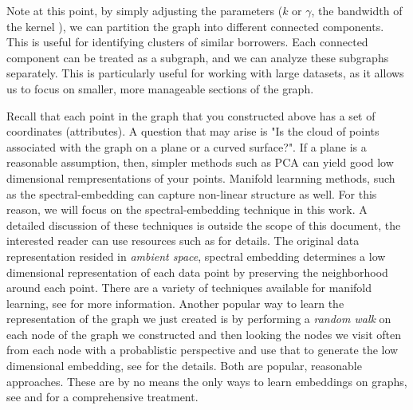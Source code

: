 \documentclass[12pt]{article}
\begin{document}
Note at this point, by simply adjusting the parameters ($k$ or $\gamma$, the bandwidth of the kernel ), we can partition the graph into different connected components. This is useful for identifying clusters of similar borrowers. Each connected component can be treated as a subgraph, and we can analyze these subgraphs separately. This is particularly useful for working with large datasets, as it allows us to focus on smaller, more manageable sections of the graph.

Recall that each point in the graph that you constructed above has a set of coordinates (attributes). A question that may arise is "Is the cloud of points associated with the graph on a plane or a curved surface?". If a plane is a reasonable assumption, then, simpler methods such as PCA can yield good low dimensional rempresentations of your points. Manifold learnning methods, such as the spectral-embedding can capture non-linear structure as well. For this reason, we will focus on the spectral-embedding technique in this work. A detailed discussion of these techniques is outside the scope of this document, the interested reader can use resources such as \cite{ghodsi_2017_unsup_learning_course} for details. The original data representation resided in \emph{ambient space}, spectral embedding determines a low dimensional representation of each data point by preserving the neighborhood around each point. There are a variety of techniques available for manifold learning, see \cite{ghodsi_2017_unsup_learning_course} for more information. Another popular way to learn the representation of the graph we just created is by performing a \emph{random walk} on each node of the graph we constructed and then looking the nodes we visit often from each node with a probablistic perspective and use that to generate the low dimensional embedding, see \cite{leskovic_jure_cs_224_rw_lecture} for the details. Both are popular, reasonable approaches. These are by no means the only ways to learn embeddings on graphs, see \cite{hamilton2020graph} and \cite{chami_etal} for a comprehensive treatment.

\printbibliography
\end{document}
